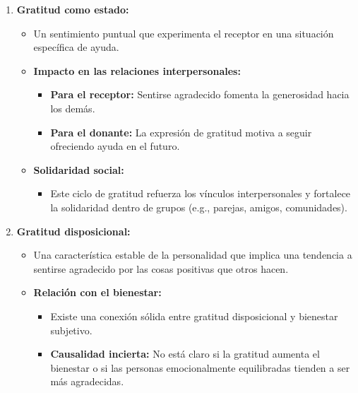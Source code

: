 \documentclass[
]{book}
\providecommand{\tightlist}{%
  \setlength{\itemsep}{0pt}\setlength{\parskip}{0pt}}
\begin{document}
\begin{enumerate}
\def\labelenumi{\arabic{enumi}.}
\tightlist
\item
  \textbf{Gratitud como estado:}

  \begin{itemize}
  \tightlist
  \item
    Un sentimiento puntual que experimenta el receptor en una situación específica de ayuda.\\
  \item
    \textbf{Impacto en las relaciones interpersonales:}

    \begin{itemize}
    \tightlist
    \item
      \textbf{Para el receptor:} Sentirse agradecido fomenta la generosidad hacia los demás.
    \item
      \textbf{Para el donante:} La expresión de gratitud motiva a seguir ofreciendo ayuda en el futuro.
    \end{itemize}
  \item
    \textbf{Solidaridad social:}

    \begin{itemize}
    \tightlist
    \item
      Este ciclo de gratitud refuerza los vínculos interpersonales y fortalece la solidaridad dentro de grupos (e.g., parejas, amigos, comunidades).
    \end{itemize}
  \end{itemize}
\item
  \textbf{Gratitud disposicional:}

  \begin{itemize}
  \tightlist
  \item
    Una característica estable de la personalidad que implica una tendencia a sentirse agradecido por las cosas positivas que otros hacen.
  \item
    \textbf{Relación con el bienestar:}

    \begin{itemize}
    \tightlist
    \item
      Existe una conexión sólida entre gratitud disposicional y bienestar subjetivo.
    \item
      \textbf{Causalidad incierta:} No está claro si la gratitud aumenta el bienestar o si las personas emocionalmente equilibradas tienden a ser más agradecidas.
    \end{itemize}
  \end{itemize}
\end{enumerate}
\end{document}

